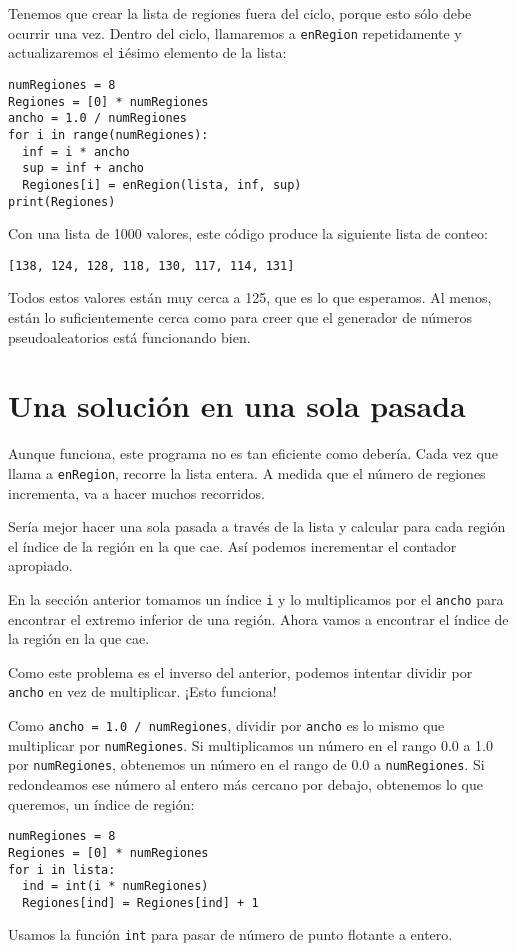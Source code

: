 Tenemos que crear la lista de regiones fuera del ciclo, porque esto
sólo debe ocurrir una vez. Dentro del ciclo, llamaremos a \texttt{enRegion}
repetidamente y actualizaremos el \texttt{i}ésimo elemento de la lista:
\begin{lstlisting}
numRegiones = 8
Regiones = [0] * numRegiones
ancho = 1.0 / numRegiones
for i in range(numRegiones):
  inf = i * ancho
  sup = inf + ancho
  Regiones[i] = enRegion(lista, inf, sup)
print(Regiones)
\end{lstlisting}
Con una lista de 1000 valores, este código produce la siguiente lista
de conteo:
\begin{verbatim}
[138, 124, 128, 118, 130, 117, 114, 131]
\end{verbatim}
Todos estos valores están muy cerca a 125, que es lo que esperamos.
Al menos, están lo suficientemente cerca como para creer que el generador
de números pseudoaleatorios está funcionando bien.

\section{Una solución en una sola pasada}

\label{histograma} 

Aunque funciona, este programa no es tan eficiente como debería. Cada
vez que llama a \texttt{enRegion}, recorre la lista entera. A medida
que el número de regiones incrementa, va a hacer muchos recorridos.

Sería mejor hacer una sola pasada a través de la lista y calcular
para cada región el índice de la región en la que cae. Así podemos
incrementar el contador apropiado.

En la sección anterior tomamos un índice \texttt{i} y lo multiplicamos
por el \texttt{ancho} para encontrar el extremo inferior de una región.
Ahora vamos a encontrar el índice de la región en la que cae.

Como este problema es el inverso del anterior, podemos intentar dividir
por \texttt{ancho} en vez de multiplicar. ¡Esto funciona!

Como \texttt{ancho = 1.0 / numRegiones}, dividir por \texttt{ancho}
es lo mismo que multiplicar por \texttt{numRegiones}. Si multiplicamos
un número en el rango 0.0 a 1.0 por \texttt{numRegiones}, obtenemos
un número en el rango de 0.0 a \texttt{numRegiones}. Si redondeamos
ese número al entero más cercano por debajo, obtenemos lo que queremos,
un índice de región:
\begin{lstlisting}
numRegiones = 8
Regiones = [0] * numRegiones
for i in lista:
  ind = int(i * numRegiones)
  Regiones[ind] = Regiones[ind] + 1
\end{lstlisting}
Usamos la función \texttt{int} para pasar de número de punto flotante
a entero.

